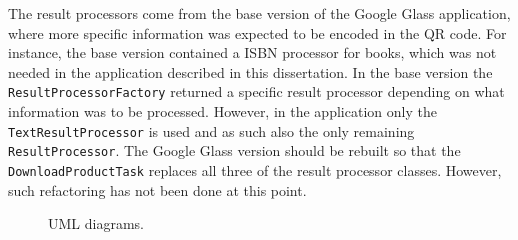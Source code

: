 The result processors come from the base version of the Google Glass application, where more specific information was expected to be encoded in the QR code. For instance, the base version contained a ISBN processor for books, which was not needed in the application described in this dissertation. In the base version the \texttt{ResultProcessorFactory} returned a specific result processor depending on what information was to be processed. However, in the application only the \texttt{TextResultProcessor} is used and as such also the only remaining \texttt{ResultProcessor}. The Google Glass version should be rebuilt so that the \texttt{DownloadProductTask} replaces all three of the result processor classes. However, such refactoring has not been done at this point. 


	\begin{figure}[ht!]
		\centering
   		 \qquad
   		 \qquad
		\caption{UML diagrams.}
		\label{umlDiagrams}
	\end{figure}
	
